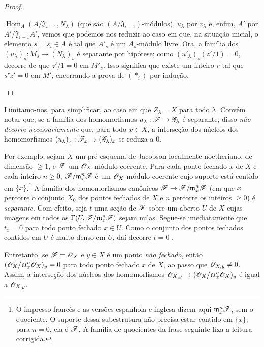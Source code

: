 \begin{proof}
\begin{enumerate}[label=(\roman*)]
  $\operatorname{Hom}_A
  (A/\mathfrak J_{i-1},
  N_\lambda)$
  (que são
  $(A/\mathfrak J_{i-1})$-módulos),
  $u_\lambda$ por
  $v_\lambda$ e,
  enfim, $A'$ por
  $A'/\mathfrak J_{i-1}A'$,
  vemos que podemos
  nos reduzir ao caso
  em que, na situação
  inicial, o elemento
  $s=s_i\in A$ é tal
  que $A'_s$ é um
  $A_s$-módulo livre.
  Ora, a família dos
  $(u_\lambda)_s:
  M_s\to(N_\lambda)_s$
  é separante por
  hipótese; como
  $(u'_\lambda)_s
  (z'/1)=0$, decorre
  de 
  que $z'/1=0$ em
  $M'_s$. Isso significa
  que existe um inteiro
  $r$ tal que
  $s^rz'=0$ em $M'$,
  encerrando a prova
  de $(*_i)$ por indução.
\end{enumerate}
\end{proof}

\begin{remark}[11.9.11]
\label{IV.11.9.11}
Limitamo-nos, para
simplificar, ao caso
em que $Z_\lambda=X$
para todo $\lambda$.
Convém notar que,
se a família dos
homomorfismos
$u_\lambda:
\sh{F}\to\sh{G}_\lambda$
é separante, disso
\emph{não decorre
necessariamente} que,
para todo $x\in X$,
a interseção dos
núcleos dos
homomorfismos
$(u_\lambda)_x:
\sh{F}_x\to
(\sh{G}_\lambda)_x$
se reduza a $0$.

Por exemplo, sejam
$X$ um pré-esquema
de Jacobson localmente
noetheriano, de
dimensão $\geq1$,
e $\mathscr{F}$ um
$\mathscr{O}_X$-módulo
coerente. Para cada
ponto fechado $x$
de $X$ e cada inteiro
$n\geq0$,
$\mathscr{F}/\mathfrak m_x^n
\mathscr{F}$ é um
$\mathscr{O}_X$-módulo
coerente cujo suporte
está contido em
$\{x\}$.\footnote{O
impresso francês e
as versões espanhola
e inglesa dizem aqui
$\mathfrak m_x^n\mathscr{F}$,
sem o quociente. O
suporte dessa
subestrutura não
precisa estar contido
em $\{x\}$; para
$n=0$, ela é
$\mathscr{F}$. A família
de quocientes da frase
seguinte fixa a leitura
corrigida.}
A família dos
homomorfismos canônicos
$\sh{F}\to
\sh{F}/\mathfrak m_x^n
\sh{F}$ (em que $x$
percorre o conjunto
$X_0$ dos pontos
fechados de $X$
e $n$ percorre os
inteiros $\geq0$)
é \emph{separante}.
Com efeito, seja $t$
uma seção de $\mathscr{F}$
sobre um aberto $U$
de $X$ cujas imagens
em todos os
$\Gamma(U,\mathscr{F}/
\mathfrak m_x^n\mathscr{F})$
sejam nulas. Segue-se
imediatamente que
$t_x=0$ para todo
ponto fechado
$x\in U$. Como o
conjunto dos pontos
fechados contidos
em $U$ é muito denso
em $U$, daí decorre
$t=0$
.

Entretanto, se
$\mathscr{F}=\mathscr{O}_X$
e $y\in X$ é um
ponto \emph{não
fechado}, então
$(\mathscr{O}_X/
\mathfrak m_x^n
\mathscr{O}_X)_y=0$
para todo ponto
fechado $x$ de $X$,
ao passo que
$\mathscr{O}_{X,y}\ne0$.
Assim, a interseção
dos núcleos dos
homomorfismos
$\sh{O}_{X,y}\to
(\sh{O}_X/
\mathfrak m_x^n
\sh{O}_X)_y$
é igual a
$\mathscr{O}_{X,y}$.
\end{remark}

